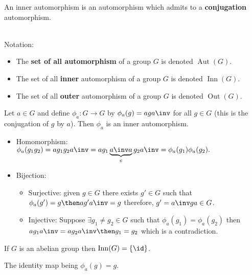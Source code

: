 \documentclass[12pt, a4paper]{article}
\DeclareMathOperator{\aut}{Aut}
\DeclareMathOperator{\inn}{Inn}
\DeclareMathOperator{\out}{Out}
\begin{document}
\begin{mdnote}
    An inner automorphism is an automorphism which admits to a \textbf{conjugation} automorphism.
\end{mdnote}

\begin{definition}
    \hphantom{space}\\
    Notation:
    \begin{itemize}
        \item The \textbf{set of all automorphism} of a group \(G\) is denoted \(\aut(G)\).
        \item The set of all \textbf{inner} automorphism of a group \(G\) is denoted \(\inn(G)\).
        \item The set of all \textbf{outer} automorphism of a group \(G\) is denoted \(\out(G)\).
    \end{itemize}
\end{definition}

\begin{example}
    Let \(a\in G\) and define \(\phi_a : G \to G\) by \(\phi_a(g) = aga\inv\) for all \(g\in G\) (this is the conjugation of \(g\) by \(a\)). Then \(\phi_a\) is an inner automorphism.
    \begin{itemize}
        \item Homomorphism: \(\phi_a(g_1g_2) = ag_1g_2a\inv = ag_1 \underbrace{a\inv a}_{e} g_2a\inv = \phi_a(g_1)\phi_a(g_2).\)
        \item Bijection:
        \begin{itemize}
            \item Surjective: given \(g\in G\) there exists \(g'\in G\) such that \(\phi_a(g')=g \then ag'a\inv =g\) therefore, \(g'=a\inv ga \in G\).
            \item Injective: Suppose \(\exists g_1\neq g_2 \in G\) such that \(\phi_a(g_1)=\phi_a(g_2)\) then \(ag_1a\inv=ag_2a\inv \then g_1=g_2\) which is a contradiction.
        \end{itemize}
    \end{itemize}
\end{example}

\begin{corollary}
    If \(G\) is an abelian group then \(\inn(G)=\{\id\}\).
\end{corollary}

\begin{mdnote}
    The identity map being \(\phi_a(g) =g\).
\end{mdnote}
\end{document}
